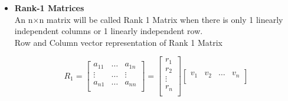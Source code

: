 \documentclass[a4paper,11pt]{article}
\numberwithin{equation}{section}
\begin{document}
\begin{itemize}
\begin{center}
        \end{center}
        \vspace{5pt}
        \item \textbf{Rank-1 Matrices}
        \vspace{5pt}\\
        An n×n matrix will be called Rank 1 Matrix when there is only 1 linearly independent columns or 1 linearly independent row.\\
        \hspace{0.5cm} Row and Column vector representation of Rank 1 Matrix
        \vspace{5pt}
        \begin{center}
            \[R_1=
                \begin{bmatrix}
                    a_{11} & \dots & a_{1n}\\
                    \vdots & \dots & \vdots \\
                    a_{n1} & \dots & a_{nn}\\
                \end{bmatrix}=
                \begin{bmatrix}
                    r_1\\
                    r_2\\
                    \vdots\\
                    r_n\\
                \end{bmatrix}
                \begin{bmatrix}
                    v_1 & v_2 & \dots & v_n\\
                \end{bmatrix}
            \]\\
        \end{center}


\end{itemize}
\end{document}
